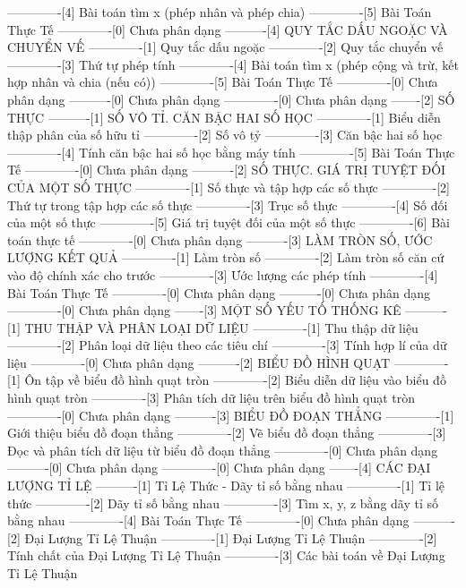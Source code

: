 -------------[4] Bài toán tìm x (phép nhân và phép chia)
-------------[5] Bài Toán Thực Tế
-------------[0] Chưa phân dạng
----------[4] QUY TẮC DẤU NGOẶC VÀ CHUYỂN VẾ
-------------[1] Quy tắc dấu ngoặc
-------------[2] Quy tắc chuyển vế
-------------[3] Thứ tự phép tính
-------------[4] Bài toán tìm x (phép cộng và trừ, kết hợp nhân và chia (nếu có))
-------------[5] Bài Toán Thực Tế
-------------[0] Chưa phân dạng
----------[0] Chưa phân dạng
-------------[0] Chưa phân dạng
-------[2] SỐ THỰC
----------[1] SỐ VÔ TỈ. CĂN BẬC HAI SỐ HỌC
-------------[1] Biểu diễn thập phân của số hữu tỉ
-------------[2] Số vô tỷ
-------------[3] Căn bậc hai số học
-------------[4] Tính căn bậc hai số học bằng máy tính
-------------[5] Bài Toán Thực Tế
-------------[0] Chưa phân dạng
----------[2] SỐ THỰC. GIÁ TRỊ TUYỆT ĐỐI CỦA MỘT SỐ THỰC
-------------[1] Số thực và tập hợp các số thực
-------------[2] Thứ tự trong tập hợp các số thực
-------------[3] Trục số thực
-------------[4] Số đối của một số thực
-------------[5] Giá trị tuyệt đối của một số thực
-------------[6] Bài toán thực tế
-------------[0] Chưa phân dạng
----------[3] LÀM TRÒN SỐ, ƯỚC LƯỢNG KẾT QUẢ
-------------[1] Làm tròn số
-------------[2] Làm tròn số căn cứ vào độ chính xác cho trước
-------------[3] Ước lượng các phép tính
-------------[4] Bài Toán Thực Tế
-------------[0] Chưa phân dạng
----------[0] Chưa phân dạng
-------------[0] Chưa phân dạng
-------[3] MỘT SỐ YẾU TỐ THỐNG KÊ
----------[1] THU THẬP VÀ PHÂN LOẠI DỮ LIỆU
-------------[1] Thu thập dữ liệu
-------------[2] Phân loại dữ liệu theo các tiêu chí
-------------[3] Tính hợp lí của dữ liệu
-------------[0] Chưa phân dạng
----------[2] BIỂU ĐỒ HÌNH QUẠT
-------------[1] Ôn tập về biểu đồ hình quạt tròn
-------------[2] Biểu diễn dữ liệu vào biểu đồ hình quạt tròn
-------------[3] Phân tích dữ liệu trên biểu đồ hình quạt tròn
-------------[0] Chưa phân dạng
----------[3] BIỂU ĐỒ ĐOẠN THẲNG
-------------[1] Giới thiệu biểu đồ đoạn thẳng
-------------[2] Vẽ biểu đồ đoạn thẳng
-------------[3] Đọc và phân tích dữ liệu từ biểu đồ đoạn thẳng
-------------[0] Chưa phân dạng
----------[0] Chưa phân dạng
-------------[0] Chưa phân dạng
-------[4] CÁC ĐẠI LƯỢNG TỈ LỆ
----------[1] Tỉ Lệ Thức - Dãy tỉ số bằng nhau
-------------[1] Tỉ lệ thức
-------------[2] Dãy tỉ số bằng nhau
-------------[3] Tìm x, y, z bằng dãy tỉ số bằng nhau
-------------[4] Bài Toán Thực Tế
-------------[0] Chưa phân dạng
----------[2] Đại Lượng Tỉ Lệ Thuận
-------------[1] Đại Lượng Tỉ Lệ Thuận
-------------[2] Tính chất của Đại Lượng Tỉ Lệ Thuận
-------------[3] Các bài toán về Đại Lượng Tỉ Lệ Thuận
